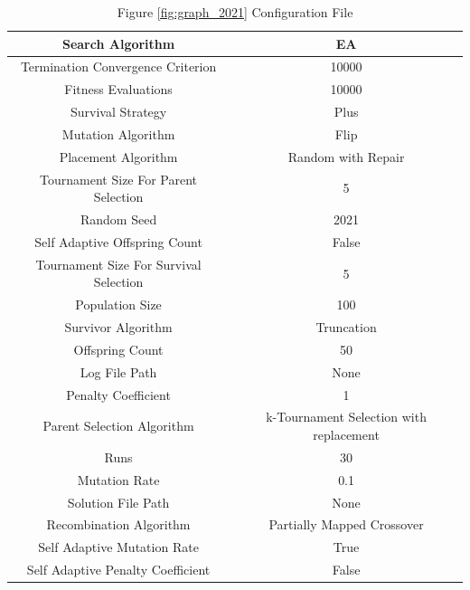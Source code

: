 \documentclass{standalone}
\begin{document}
\clearpage
\begin{table}[!htb]
	\centering
	\caption{Figure \ref{fig:graph_2021} Configuration File}
	\label{tab:graph_2021}
	\begin{tabular}{| c | c |}
		\hline
		Search Algorithm		& EA		 \\
		\hline
		Termination Convergence Criterion		& 10000		 \\
		\hline
		Fitness Evaluations		& 10000		 \\
		\hline
		Survival Strategy		& Plus		 \\
		\hline
		Mutation Algorithm		& Flip		 \\
		\hline
		Placement Algorithm		& Random with Repair		 \\
		\hline
		Tournament Size For Parent Selection		& 5		 \\
		\hline
		Random Seed		& 2021		 \\
		\hline
		Self Adaptive Offspring Count		& False		 \\
		\hline
		Tournament Size For Survival Selection		& 5		 \\
		\hline
		Population Size		& 100		 \\
		\hline
		Survivor Algorithm		& Truncation		 \\
		\hline
		Offspring Count		& 50		 \\
		\hline
		Log File Path		& None		 \\
		\hline
		Penalty Coefficient		& 1		 \\
		\hline
		Parent Selection Algorithm		& k-Tournament Selection with replacement		 \\
		\hline
		Runs		& 30		 \\
		\hline
		Mutation Rate		& 0.1		 \\
		\hline
		Solution File Path		& None		 \\
		\hline
		Recombination Algorithm		& Partially Mapped Crossover		 \\
		\hline
		Self Adaptive Mutation Rate		& True		 \\
		\hline
		Self Adaptive Penalty Coefficient		& False		 \\
		\hline
	\end{tabular}
\end{table}
\end{document}
